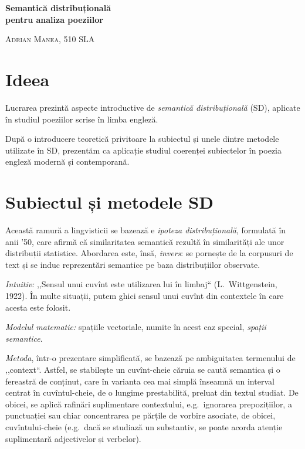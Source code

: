 \documentclass[a4paper]{article}
\begin{document}
\begin{center}
  {\Large\textbf{Semantică distribuțională \\
      pentru analiza poeziilor}}

  \textsc{Adrian Manea, 510 SLA}
\end{center}

\section*{Ideea}

\indent\indent Lucrarea prezintă aspecte introductive de
\emph{semantică distribuțională} (SD), aplicate în studiul
poeziilor scrise în limba engleză.

După o introducere teoretică privitoare la subiectul și unele dintre metodele
utilizate în SD, prezentăm ca aplicație studiul coerenței subiectelor în
poezia engleză modernă și contemporană.

\section*{Subiectul și metodele SD}

Această ramură a lingvisticii se bazează e \emph{ipoteza distribuțională},
formulată în anii '50, care afirmă că similaritatea semantică rezultă în
similarități ale unor distribuții statistice. Abordarea este, însă,
\emph{invers}: se pornește de la corpusuri de text și se induc reprezentări
semantice pe baza distribuțiilor observate.

\emph{Intuitiv:} ,,Sensul unui cuvînt este utilizarea lui în limbaj``
(L.\ Wittgenstein, 1922). În multe situații, putem ghici sensul unui cuvînt
din contextele în care acesta este folosit.

\emph{Modelul matematic:} spațiile vectoriale, numite în acest caz special,
\emph{spații semantice}.

\emph{Metoda}, într-o prezentare simplificată, se bazează pe ambiguitatea
termenului de ,,context``. Astfel, se stabilește un cuvînt-cheie căruia
se caută semantica și o fereastră de conținut, care în varianta cea mai
simplă înseamnă un interval centrat în cuvîntul-cheie, de o lungime
prestabilită, preluat din textul studiat. De obicei, se aplică rafinări
suplimentare contextului, e.g.\ ignorarea prepozițiilor, a punctuației sau
chiar concentrarea pe părțile de vorbire asociate, de obicei, cuvîntului-cheie
(e.g.\ dacă se studiază un substantiv, se poate acorda atenție suplimentară
adjectivelor și verbelor).
\end{document}
